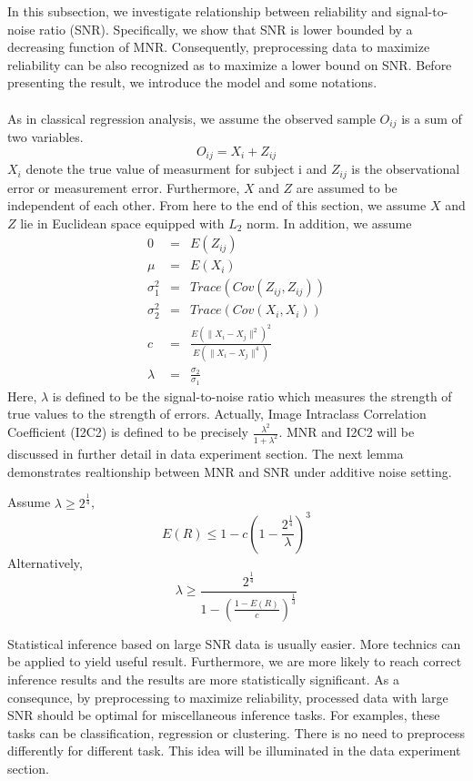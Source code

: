 \documentclass{article}
\begin{document}
In this subsection, we investigate relationship between reliability and signal-to-noise ratio (SNR). Specifically, we show that SNR is lower bounded by a decreasing function of MNR. Consequently, preprocessing data to maximize reliability can be also recognized as to maximize a lower bound on SNR. Before presenting the result, we introduce the model and some notations. \\
\\
As in classical regression analysis, we assume the observed sample $O_{ij}$ is a sum of two variables.
\[O_{ij}=X_i+Z_{ij}\]
$X_i$ denote the true value of measurment for subject i and $Z_{ij}$ is the observational error or measurement error. Furthermore, $X$ and $Z$ are assumed to be independent of each other. From here to the end of this section, we assume $X$ and $Z$ lie in Euclidean space equipped with $L_2$ norm. In addition, we assume 
\begin{eqnarray*}
0&=& E(Z_{ij}) \\
\mu &=&E(X_i)\\
\sigma_1^2&=&Trace(Cov(Z_{ij},Z_{ij})) \\
\sigma_2^2&=&Trace(Cov(X_{i},X_{i}))\\
c&=&\frac{E(\|X_i-X_j \|^2)^2}{E(\|X_i-X_j \|^4)} \\
\lambda&=&\frac{\sigma_2}{\sigma_1} 
\end{eqnarray*}
Here, $\lambda$ is defined to be the signal-to-noise ratio which measures the strength of true values to the strength of errors. Actually, Image Intraclass Correlation Coefficient (I2C2) is defined to be precisely $\frac{\lambda^2}{1+\lambda^2}$. MNR and I2C2 will be discussed in further detail in data experiment section. The next lemma demonstrates realtionship between MNR and SNR under additive noise setting.

\begin{lemma} 
Assume $\lambda \geq 2^{\frac{1}{4}}$, 
\[E(R) \leq 1-c(1-\frac{2^{\frac{1}{4}}}{\lambda})^3 \] 
Alternatively,
\[\lambda \geq \frac{2^{\frac{1}{4}}}{1-(\frac{1-E(R)}{c})^{\frac{1}{3}}} \]
\end{lemma}
\noindent Statistical inference based on large SNR data is usually easier. More technics can be applied to yield useful result. Furthermore, we are more likely to reach correct inference results and the results are more statistically significant. As a consequnce, by preprocessing to maximize reliability, processed data with large SNR should be optimal for miscellaneous inference tasks. For examples, these tasks can be classification, regression or clustering. There is no need to preprocess differently for different task. This idea will be illuminated in the data experiment section.
\end{document}
